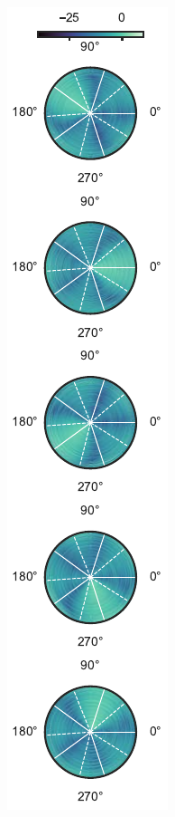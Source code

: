 \documentclass[sip,biber]{now-journal}
\begin{document}
\begin{figure}[t]
  \begin{minipage}[t]{.3\linewidth}
    \centering\includegraphics{figures/plots/beam-pattern/polar_RTcov_ref.pdf}\label{fig:plot:bp:pol:ref}
  \end{minipage}
  \begin{minipage}[t]{.3\linewidth}

\end{minipage}
\end{figure}
\end{document}
